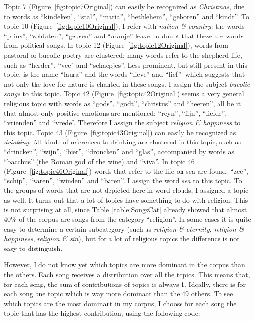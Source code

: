 Topic 7 (Figure~\ref{fig:topic7Original}) can easily be recognized as \textit{Christmas}, due to words as \enquote{kindeken}, \enquote{stal}, \enquote{maria}, \enquote{bethlehem}, \enquote{geboren} and \enquote{kindt}. To topic 10 (Figure~\ref{fig:topic10Original}), I refer with \textit{nation \& country}: the words \enquote{prins}, \enquote{soldaten}, \enquote{geusen} and \enquote{oranje} leave no doubt that these are words from political songs. In topic 12 (Figure~\ref{fig:topic12Original}), words from pastoral or bucolic poetry are clustered: many words refer to the shepherd life, such as \enquote{herder}, \enquote{vee} and \enquote{schaepjes}. Less prominent, but still present in this topic, is the name \enquote{laura} and the words \enquote{lieve} and \enquote{lief}, which suggests that not only the love for nature is chanted in these songs. I assign the subject \textit{bucolic songs} to this topic. Topic 42 (Figure~\ref{fig:topic42Original}) seems a very general religious topic with words as \enquote{gods}, \enquote{godt}, \enquote{christus} and \enquote{heeren}, all be it that almost only positive emotions are mentioned: \enquote{reyn}, \enquote{fijn}, \enquote{liefde}, \enquote{vrienden} and \enquote{vrede}. Therefore I assign the subject \textit{religion \& happiness} to this topic. Topic 43 (Figure~\ref{fig:topic43Original}) can easily be recognized as \textit{drinking}. All kinds of references to drinking are clustered in this topic, such as \enquote{drincken}, \enquote{wijn}, \enquote{bier}, \enquote{droncken} and \enquote{glas}, accompanied by words as \enquote{bacchus} (the Roman god of the wine) and \enquote{viva}. In topic 46 (Figure~\ref{fig:topic46Original}) words that refer to the life on sea are found: \enquote{zee}, \enquote{schip}, \enquote{varen}, \enquote{winden} and \enquote{baren}. I assign the word \textit{sea} to this topic. To the groups of words that are not depicted here in word clouds, I assigned a topic as well. It turns out that a lot of topics have something to do with religion. This is not surprising at all, since Table~\ref{table:SongsCat} already showed that almost 40\% of the corpus are songs from the category \enquote{religion}. In some cases it is quite easy to determine a certain subcategory (such as \textit{religion \& eternity}, \textit{religion \& happiness}, \textit{ religion \& sin}), but for a lot of religious topics the difference is not easy to distinguish.

However, I do not know yet which topics are more dominant in the corpus than the others. Each song receives a distribution over all the topics. This means that, for each song,  the sum of contributions of topics is always 1. Ideally, there is for each song one topic which is way more dominant than the 49 others. To see which topics are the most dominant in my corpus, I choose for each song the topic that has the highest contribution, using the following code:


